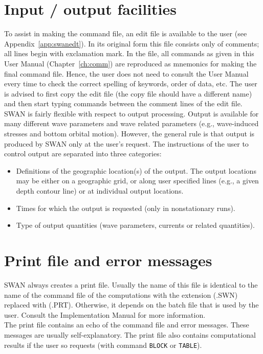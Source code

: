 \documentclass[12pt]{book}
\begin{document}
\section{Input / output facilities}
To assist in making the command file, an edit file is available to the user (see Appendix~\ref{app:swanedt}). In its original
form this file consists only of comments; all lines begin with exclamation mark. In the file, all commands
as given in this User Manual (Chapter~\ref{ch:comm}) are reproduced as mnemonics for making the final command
file. Hence, the user does not need to consult the User Manual every time to check the correct spelling
of keywords, order of data, etc. The user is advised to first copy the edit file (the copy file should have a
different name) and then start typing commands between the comment lines of the edit file.
\\[2ex]
\noindent
SWAN is fairly flexible with respect to output processing. Output is available for many different wave
parameters and wave related parameters (e.g., wave-induced stresses and bottom orbital motion).
However, the general rule is that output is produced by SWAN only at the user's request. The instructions
of the user to control output are separated into three categories:
\begin{itemize}
  \item Definitions of the geographic location(s) of the output. The output locations may be either on a
        geographic grid, or along user specified lines (e.g., a given depth contour line) or at
        individual output locations.
  \item Times for which the output is requested (only in nonstationary runs).
  \item Type of output quantities (wave parameters, currents or related quantities).
\end{itemize}

\section{Print file and error messages}
\label{sec:prtfile}
SWAN always creates a print file. Usually the name of this file is identical to the name of the command
file of the computations with the extension (.SWN) replaced with (.PRT). Otherwise, it depends on the
batch file that is used by the user. Consult the Implementation Manual for more information.
\\[2ex]
\noindent
The print file contains an echo of the command file and error messages. These messages are usually
self-explanatory. The print
file also contains computational results if the user so requests (with command {\tt BLOCK} or {\tt TABLE}).
\end{document}
